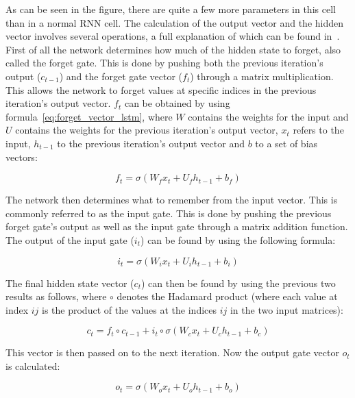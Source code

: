 As can be seen in the figure, there are quite a few more parameters in this cell than in a normal RNN cell. The calculation of the output vector and the hidden vector involves several operations, a full explanation of which can be found in~\cite{olah2015understanding}. First of all the network determines how much of the hidden state to forget, also called the forget gate. This is done by pushing both the previous iteration's output (\(c_{t-1}\)) and the forget gate vector (\(f_t\)) through a matrix multiplication. This allows the network to forget values at specific indices in the previous iteration's output vector. \(f_t\) can be obtained by using formula~\ref{eq:forget_vector_lstm}, where \(W\) contains the weights for the input and \(U\) contains the weights for the previous iteration's output vector, \(x_t\) refers to the input, \(h_{t-1}\) to the previous iteration's output vector and \(b\) to a set of bias vectors:

\begin{equation} \label{eq:forget_vector_lstm}
f_t = \sigma(W_f x_t + U_f h_{t-1} + b_f)
\end{equation}

The network then determines what to remember from the input vector. This is commonly referred to as the input gate. This is done by pushing the previous forget gate's output as well as the input gate through a matrix addition function. The output of the input gate (\(i_t\)) can be found by using the following formula:

\begin{equation} \label{eq:input_vector_lstm}
i_t = \sigma(W_i x_t + U_i h_{t-1} + b_i)
\end{equation}

The final hidden state vector (\(c_t\)) can then be found by using the previous two results as follows, where \(\circ \) denotes the Hadamard product (where each value at index \(ij\) is the product of the values at the indices \(ij\) in the two input matrices): 

\begin{equation} \label{eq:hidden_state_vector_lstm}
c_t = f_t \circ c_{t-1} + i_t \circ \sigma(W_c x_t + U_c h_{t-1} + b_c)
\end{equation}

This vector is then passed on to the next iteration. Now the output gate vector \(o_t\) is calculated:

\begin{equation} \label{eq:output_gate_lstm}
o_t = \sigma(W_o x_t + U_o h_{t-1} + b_o)
\end{equation}

